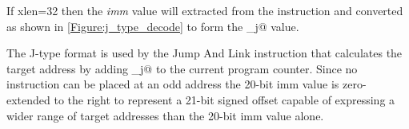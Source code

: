 

If \Gls{xlen}=32 then the {\em imm} value will extracted from the 
instruction and converted as shown in \autoref{Figure:j_type_decode} to
form the \verb@imm_j@ value.

\begin{figure}[ht]
\centering
\DrawInsnOpJTypeDecoding
{}
\label{Figure:j_type_decode}
\label{imm.j:decode}
\end{figure}


%
%
%
%

The J-type format is used by the Jump And Link instruction that calculates 
the target address by adding \verb@imm_j@ to the current program 
counter.  Since no instruction can be placed at an odd address the 20-bit 
imm value is zero-extended to the right to represent a 21-bit signed offset 
capable of expressing a wider range of target addresses than the 20-bit 
imm value alone.

